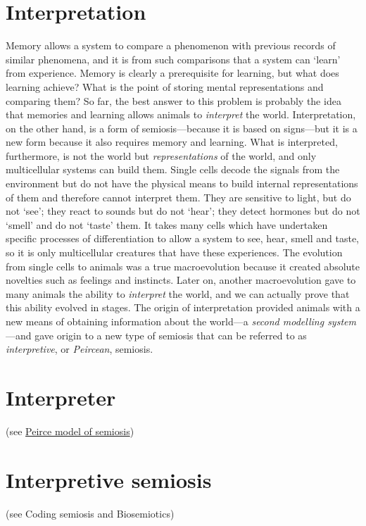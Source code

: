 \documentclass[12pt]{article}
\begin{document}
\section{Interpretation}
Memory allows a system to compare a phenomenon with previous records of similar phenomena, and it is from such comparisons that a system can `learn' from experience. Memory is clearly a prerequisite for learning, but what does learning achieve? What is the point of storing mental representations and comparing them? So far, the best answer to this problem is probably the idea that memories and learning allows animals to \textit{interpret} the world. Interpretation, on the other hand, is a form of semiosis---because it is based on signs---but it is a new form because it also requires memory and learning. What is interpreted, furthermore, is not the world but \textit{representations} of the world, and only multicellular systems can build them. Single cells decode the signals from the environment but do not have the physical means to build internal representations of them and therefore cannot interpret them. They are sensitive to light, but do not `see'; they react to sounds but do not `hear'; they detect hormones but do not `smell' and do not `taste' them. It takes many cells which have undertaken specific processes of differentiation to allow a system to see, hear, smell and taste, so it is only multicellular creatures that have these experiences. The evolution from single cells to animals was a true macroevolution because it created absolute novelties such as feelings and instincts. Later on, another macroevolution gave to many animals the ability to \textit{interpret} the world, and we can actually prove that this ability evolved in stages. The origin of interpretation provided animals with a new means of obtaining information about the world---a \textit{second modelling system}---and gave origin to a new type of semiosis that can be referred to as \textit{interpretive}, or \textit{Peircean}, semiosis. 


\section{Interpreter} (see \hyperlink{peirce_model_of_semiosis}{Peirce model of semiosis})


\section{Interpretive semiosis} (see Coding semiosis and Biosemiotics)
\end{document}

